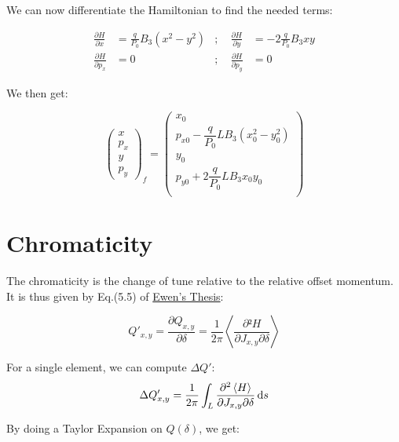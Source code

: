 We can now differentiate the Hamiltonian to find the needed terms:

\begin{equation}
\begin{aligned}
\frac{\partial H}{\partial x} &= \frac{q}{P_0} B_3 (x^2 - y^2) &; \quad \frac{\partial H}{\partial y} &= -2 \frac{q}{P_0} B_3 x y \\
\frac{\partial H}{\partial p_x} &= 0                 &; \quad \frac{\partial H}{\partial p_y} &= 0
\end{aligned}
\end{equation}

We then get:

\begin{equation}
\begin{pmatrix}
x \\ p_x \\ y \\ p_y
\end{pmatrix}_f
=
\begin{pmatrix}
x_0 \\
p_{x0} - \dfrac{q}{P_0} L B_3 (x_0^2 - y_0^2) \\
y_0 \\
p_{y0} + 2\dfrac{q}{P_0} L B_3 x_0 y_0 \\
\end{pmatrix}
\end{equation}

\newpage

\hypertarget{chromaticity}{%
\section{Chromaticity}\label{chromaticity}}

The chromaticity is the change of tune relative to the relative offset
momentum. It is thus given by Eq.(5.5) of
\href{https://cds.cern.ch/record/1951379/files/Thesis-2014-Ewen}{Ewen's
Thesis}:

\[Q'_{x,y} = \frac{\partial Q_{x,y}}{\partial \delta} = \frac{1}{2\pi}\left< \frac{\partial² H}{\partial J_{x,y}\partial \delta}\right>\]

For a single element, we can compute $\Delta Q'$:
\begin{equation}\Delta Q_{x,y}' = \frac{1}{2\pi} \int_L \frac{\partial^2 \left< H \right>}{\partial J_{x,y} \partial \delta} \mathop{}\!\mathrm{d} s\label{eq:chroma}\end{equation}

By doing a Taylor Expansion on \(Q(\delta)\), we get:

